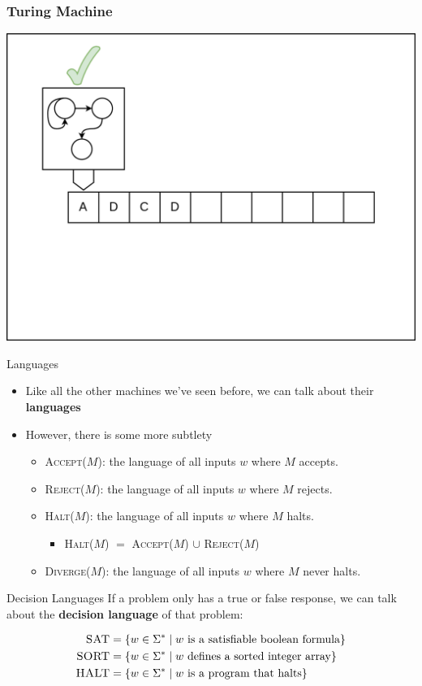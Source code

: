 \documentclass[aspectratio=169]{beamer}
\begin{document}
\begin{frame}
  \frametitle{Turing Machine}
  \begin{center}
    \includegraphics[width=.75\textwidth]{frame5.png}
  \end{center}
\end{frame}

\begin{frame}{Languages}
    \begin{itemize}
        \item Like all the other machines we've seen before, we can talk about their \textbf{languages}
        \item However, there is some more subtlety \pause
        \begin{itemize}
            \item \textsc{Accept($M$)}: the language of all inputs $w$ where $M$ accepts. \pause
            \item \textsc{Reject($M$)}: the language of all inputs $w$ where $M$ rejects. \pause
            \item \textsc{Halt($M$)}: the language of all inputs $w$ where $M$ halts.
            \begin{itemize}
                \item \textsc{Halt($M$)} $=$ \textsc{Accept($M$)} $\cup$ \textsc{Reject($M$)} \pause
            \end{itemize}
            \item \textsc{Diverge($M$)}: the language of all inputs $w$ where $M$ never halts.
    \end{itemize}
    \end{itemize}
\end{frame}

\begin{frame}{Decision Languages}
    If a problem only has a true or false response, we can talk about the \textbf{decision language} of that problem: \pause
    
    \begin{align*}
        \textsc{SAT} &= \{w \in \Sigma^* \mid w \text{ is a satisfiable boolean formula}\} \\
        \textsc{SORT} &= \{w \in \Sigma^* \mid w \text{ defines a sorted integer array}\} \\
        \textsc{HALT} &=  \{w \in \Sigma^* \mid w \text{ is a program that halts}\}
    \end{align*}
\end{frame}
\end{document}
